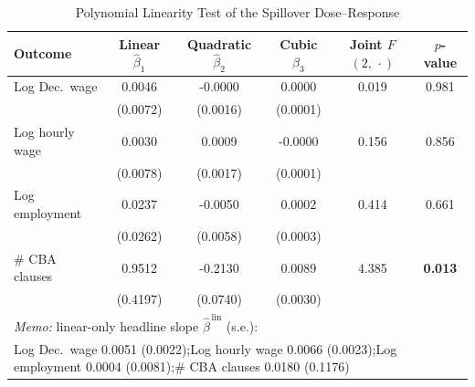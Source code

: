 \begin{table}[H]
\centering
\caption{Polynomial Linearity Test of the Spillover Dose--Response}
\label{tab:linearity_did_poly}
\scriptsize
\begin{tabular}{lccccc}
\toprule\toprule
Outcome & \shortstack{Linear\\$\widehat{\beta}_1$} & \shortstack{Quadratic\\$\widehat{\beta}_2$} & \shortstack{Cubic\\$\widehat{\beta}_3$} & \shortstack{Joint $F$\\$(2,\,\cdot)$} & $p$-value \\
\midrule
Log Dec.\ wage & 0.0046 & -0.0000 & 0.0000 & 0.019 & 0.981 \\
 & (0.0072) & (0.0016) & (0.0001) & & \\
Log hourly wage & 0.0030 & 0.0009 & -0.0000 & 0.156 & 0.856 \\
 & (0.0078) & (0.0017) & (0.0001) & & \\
Log employment & 0.0237 & -0.0050 & 0.0002 & 0.414 & 0.661 \\
 & (0.0262) & (0.0058) & (0.0003) & & \\
\# CBA clauses & 0.9512 & -0.2130 & 0.0089 & 4.385 & \textbf{0.013} \\
 & (0.4197) & (0.0740) & (0.0030) & & \\
\midrule
\multicolumn{6}{l}{\textit{Memo:} linear-only headline slope $\widehat{\beta}^{\,\text{lin}}$ (s.e.):} \\
\multicolumn{6}{l}{\hspace{1em}Log Dec.\ wage 0.0051 (0.0022);\quad Log hourly wage 0.0066 (0.0023);\quad Log employment 0.0004 (0.0081);\quad \# CBA clauses 0.0180 (0.1176)} \\
\bottomrule
\end{tabular}
\begin{minipage}{\linewidth}
\footnotesize\vspace{4pt}

\end{minipage}
\end{table}
